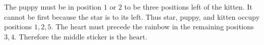 The puppy must be in position $1$ or $2$ to be three positions left of the kitten. It cannot be first because the star is to its left. Thus star, puppy, and kitten occupy positions $1,2,5$. The heart must precede the rainbow in the remaining positions $3,4$. Therefore the middle sticker is the $\boxed{\text{heart}}$.

